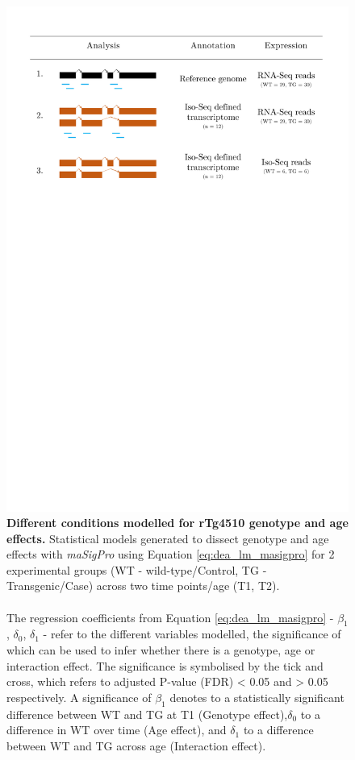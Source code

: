 \begin{figure}[!htp]
	\centering
	\includegraphics[page=2,trim={0 5cm 0 4cm},scale = 0.45]{Figures/Tg4510_diff_figures.pdf}
	\captionsetup{width=0.95\textwidth}
	\caption[Different conditions modelled for rTg4510 genotype and age effects]%
	{\textbf{Different conditions modelled for rTg4510 genotype and age effects.} Statistical models generated to dissect genotype and age effects with \textit{maSigPro} using Equation \ref{eq:dea_lm_masigpro} for 2 experimental groups (WT - wild-type/Control, TG - Transgenic/Case) across two time points/age (T1, T2). 
	\\\\
	The regression coefficients from Equation \ref{eq:dea_lm_masigpro} - $\beta_{1}$, $\delta_{0}$, $\delta_{1}$ - refer to the different variables modelled, the significance of which can be used to infer whether there is a genotype, age or interaction effect. The significance is symbolised by the tick and cross, which refers to adjusted P-value (FDR) < 0.05 and > 0.05 respectively. A significance of  $\beta_{1}$ denotes to a statistically significant difference between WT and TG at T1 (Genotype effect),$\delta_{0}$ to a difference in WT over time (Age effect), and $\delta_{1}$ to a difference between WT and TG across age (Interaction effect).}   
	\label{fig:dea_model}
\end{figure}

